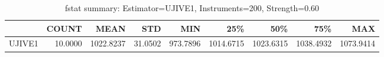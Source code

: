 \begin{table}[ht]
\centering
\caption{fstat summary: Estimator=UJIVE1, Instruments=200, Strength=0.60}
\begin{tabular}{lrrrrrrrr}
\toprule
 & COUNT & MEAN & STD & MIN & 25\% & 50\% & 75\% & MAX \\
\midrule
UJIVE1 & 10.0000 & 1022.8237 & 31.0502 & 973.7896 & 1014.6715 & 1023.6315 & 1038.4932 & 1073.9414 \\
\bottomrule
\end{tabular}
\end{table}

